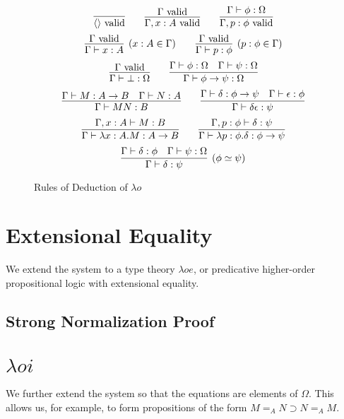 \begin{figure}
\begin{framed}
\[ \infer{\langle \rangle \vald}{} \qquad
\infer{\Gamma, x : A \vald}{\Gamma \vald} \qquad 
\infer{\Gamma, p : \phi \vald}{\Gamma \vdash \phi : \Omega} \]
\[ \infer[(x : A \in \Gamma)]{\Gamma \vdash x : A}{\Gamma \vald} \qquad
\infer[(p : \phi \in \Gamma)]{\Gamma \vdash p : \phi}{\Gamma \vald} \]
\[ \infer{\Gamma \vdash \bot : \Omega}{\Gamma \vald} \qquad
\infer{\Gamma \vdash \phi \rightarrow \psi : \Omega}{\Gamma \vdash \phi : \Omega \quad \Gamma \vdash \psi : \Omega} \]
\[ \infer{\Gamma \vdash M N : B} {\Gamma \vdash M : A \rightarrow B \quad \Gamma \vdash N : A} \qquad
\infer{\Gamma \vdash \delta \epsilon : \psi} {\Gamma \vdash \delta : \phi \rightarrow \psi \quad \Gamma \vdash \epsilon : \phi} \]
\[ \infer{\Gamma \vdash \lambda x:A.M : A \rightarrow B}{\Gamma, x : A \vdash M : B} \qquad
\infer{\Gamma \vdash \lambda p : \phi . \delta : \phi \rightarrow \psi}{\Gamma, p : \phi \vdash \delta : \psi} \]
\[ \infer[(\phi \simeq \psi)]{\Gamma \vdash \delta : \psi}{\Gamma \vdash \delta : \phi \quad \Gamma \vdash \psi : \Omega} \]
\end{framed}
\caption{Rules of Deduction of $\lambda o$}
\label{fig:lambdao}
\end{figure}

\section{Extensional Equality}

We extend the system to a type theory $\lambda o e$, or predicative higher-order propositional logic with extensional equality.







\subsection{Strong Normalization Proof}






\section{$\lambda o i$}

We further extend the system so that the equations are elements of $\Omega$.  This allows us, for example,
to form propositions of the form $M =_A N \supset N =_A M$.

